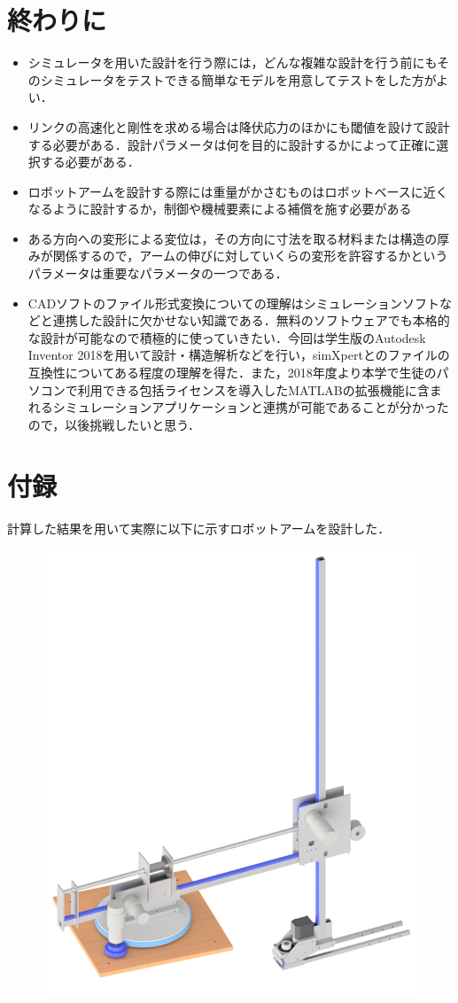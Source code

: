 \documentclass[10pt,b5paper,papersize,dvipdfmx]{jsbook}
\begin{document}
\section{終わりに}
\begin{itemize}
\item シミュレータを用いた設計を行う際には，どんな複雑な設計を行う前にもそのシミュレータをテストできる簡単なモデルを用意してテストをした方がよい．
\item リンクの高速化と剛性を求める場合は降伏応力のほかにも閾値を設けて設計する必要がある．設計パラメータは何を目的に設計するかによって正確に選択する必要がある．
\item ロボットアームを設計する際には重量がかさむものはロボットベースに近くなるように設計するか，制御や機械要素による補償を施す必要がある
\item ある方向への変形による変位は，その方向に寸法を取る材料または構造の厚みが関係するので，アームの伸びに対していくらの変形を許容するかというパラメータは重要なパラメータの一つである．
\item CADソフトのファイル形式変換についての理解はシミュレーションソフトなどと連携した設計に欠かせない知識である．無料のソフトウェアでも本格的な設計が可能なので積極的に使っていきたい．今回は学生版のAutodesk Inventor 2018を用いて設計・構造解析などを行い，simXpertとのファイルの互換性についてある程度の理解を得た．また，2018年度より本学で生徒のパソコンで利用できる包括ライセンスを導入したMATLABの拡張機能に含まれるシミュレーションアプリケーションと連携が可能であることが分かったので，以後挑戦したいと思う．
\end{itemize}

\section{付録}
計算した結果を用いて実際に以下に示すロボットアームを設計した．
\begin{figure}[h]
  \centering
  \includegraphics[width=.75\textwidth]{img/robot33.png}
\end{figure}
\end{document}
